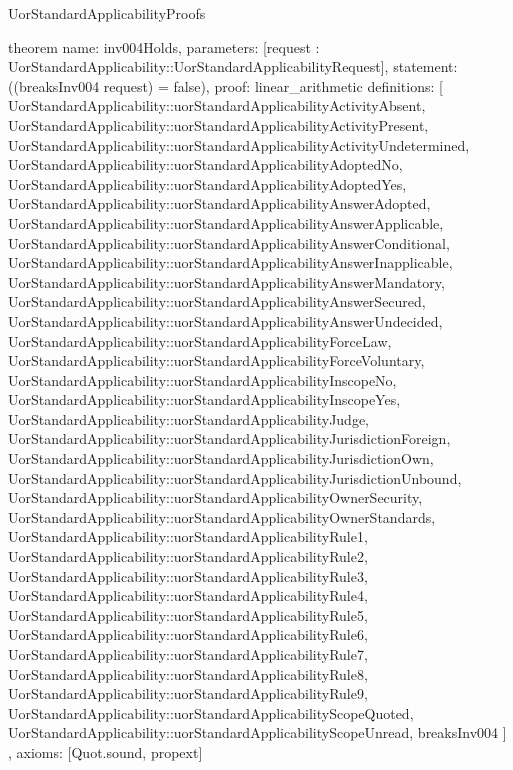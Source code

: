 \begin{lexlean}{UorStandardApplicabilityProofs}
\begin{semanticmodule}
theorem{
  name: inv004Holds,
  parameters: [request : UorStandardApplicability::UorStandardApplicabilityRequest],
  statement: ((breaksInv004 request) = false),
  proof: linear_arithmetic{
    definitions: [
      UorStandardApplicability::uorStandardApplicabilityActivityAbsent,
      UorStandardApplicability::uorStandardApplicabilityActivityPresent,
      UorStandardApplicability::uorStandardApplicabilityActivityUndetermined,
      UorStandardApplicability::uorStandardApplicabilityAdoptedNo,
      UorStandardApplicability::uorStandardApplicabilityAdoptedYes,
      UorStandardApplicability::uorStandardApplicabilityAnswerAdopted,
      UorStandardApplicability::uorStandardApplicabilityAnswerApplicable,
      UorStandardApplicability::uorStandardApplicabilityAnswerConditional,
      UorStandardApplicability::uorStandardApplicabilityAnswerInapplicable,
      UorStandardApplicability::uorStandardApplicabilityAnswerMandatory,
      UorStandardApplicability::uorStandardApplicabilityAnswerSecured,
      UorStandardApplicability::uorStandardApplicabilityAnswerUndecided,
      UorStandardApplicability::uorStandardApplicabilityForceLaw,
      UorStandardApplicability::uorStandardApplicabilityForceVoluntary,
      UorStandardApplicability::uorStandardApplicabilityInscopeNo,
      UorStandardApplicability::uorStandardApplicabilityInscopeYes,
      UorStandardApplicability::uorStandardApplicabilityJudge,
      UorStandardApplicability::uorStandardApplicabilityJurisdictionForeign,
      UorStandardApplicability::uorStandardApplicabilityJurisdictionOwn,
      UorStandardApplicability::uorStandardApplicabilityJurisdictionUnbound,
      UorStandardApplicability::uorStandardApplicabilityOwnerSecurity,
      UorStandardApplicability::uorStandardApplicabilityOwnerStandards,
      UorStandardApplicability::uorStandardApplicabilityRule1,
      UorStandardApplicability::uorStandardApplicabilityRule2,
      UorStandardApplicability::uorStandardApplicabilityRule3,
      UorStandardApplicability::uorStandardApplicabilityRule4,
      UorStandardApplicability::uorStandardApplicabilityRule5,
      UorStandardApplicability::uorStandardApplicabilityRule6,
      UorStandardApplicability::uorStandardApplicabilityRule7,
      UorStandardApplicability::uorStandardApplicabilityRule8,
      UorStandardApplicability::uorStandardApplicabilityRule9,
      UorStandardApplicability::uorStandardApplicabilityScopeQuoted,
      UorStandardApplicability::uorStandardApplicabilityScopeUnread,
      breaksInv004
    ]
  },
  axioms: [Quot.sound, propext]
}


\end{semanticmodule}
\end{lexlean}
